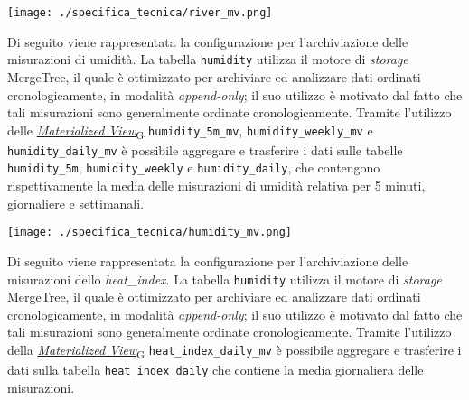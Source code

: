 \begin{center}
	\texttt{[image: ./specifica\_tecnica/river\_mv.png]}
\end{center}

Di seguito viene rappresentata la configurazione per l'archiviazione delle misurazioni di umidità. La tabella \texttt{humidity} utilizza il motore di \textit{storage}
MergeTree, il quale è ottimizzato per archiviare ed analizzare dati ordinati cronologicamente, in modalità \textit{append-only}; il suo
utilizzo è motivato dal fatto che tali misurazioni sono generalmente ordinate cronologicamente.
Tramite l'utilizzo delle \href{https://7last.github.io/docs/pb/documentazione-interna/glossario\#materialized-view}{\textit{Materialized View}\textsubscript{G}} \texttt{humidity\_5m\_mv}, \texttt{humidity\_weekly\_mv} e \texttt{humidity\_daily\_mv}
è possibile aggregare e trasferire i dati sulle tabelle \texttt{humidity\_5m}, \texttt{humidity\_weekly} e \texttt{humidity\_daily},
che contengono rispettivamente la media delle misurazioni di umidità relativa per 5 minuti, giornaliere e settimanali.
\begin{center}
	\texttt{[image: ./specifica\_tecnica/humidity\_mv.png]}
\end{center}

Di seguito viene rappresentata la configurazione per l'archiviazione delle misurazioni dello \textit{heat\_index}. La tabella \texttt{humidity} utilizza il motore di \textit{storage}
MergeTree, il quale è ottimizzato per archiviare ed analizzare dati ordinati cronologicamente, in modalità \textit{append-only}; il suo
utilizzo è motivato dal fatto che tali misurazioni sono generalmente ordinate cronologicamente.
Tramite l'utilizzo della \href{https://7last.github.io/docs/pb/documentazione-interna/glossario\#materialized-view}{\textit{Materialized View}\textsubscript{G}} \texttt{heat\_index\_daily\_mv} è possibile aggregare e trasferire i dati sulla tabella \texttt{heat\_index\_daily}
che contiene la media giornaliera delle misurazioni.

